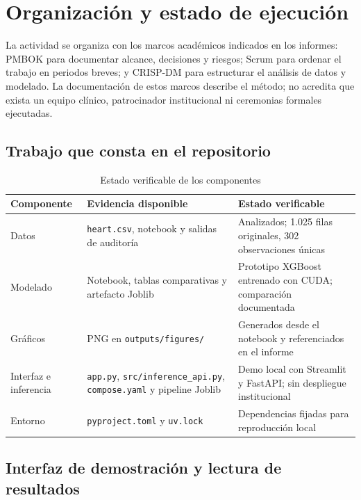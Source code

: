 \section{Organización y estado de ejecución}
\label{sec:gobernanza-ejecucion}

La actividad se organiza con los marcos académicos indicados en los informes: PMBOK para documentar alcance, decisiones y riesgos; Scrum para ordenar el trabajo en periodos breves; y CRISP-DM para estructurar el análisis de datos y modelado. La documentación de estos marcos describe el método; no acredita que exista un equipo clínico, patrocinador institucional ni ceremonias formales ejecutadas.

\subsection{Trabajo que consta en el repositorio}

\begin{table}[H]
  \centering
  \caption{Estado verificable de los componentes}
  \label{tab:estado-componentes}
  \small
  \begin{tabularx}{\textwidth}{@{}p{3cm}X X@{}}
    \toprule
    Componente & Evidencia disponible & Estado verificable \\
    \midrule
    Datos & \texttt{heart.csv}, notebook y salidas de auditoría & Analizados; 1.025 filas originales, 302 observaciones únicas \\
    Modelado & Notebook, tablas comparativas y artefacto Joblib & Prototipo XGBoost entrenado con CUDA; comparación documentada \\
    Gráficos & PNG en \texttt{outputs/figures/} & Generados desde el notebook y referenciados en el informe \\
    Interfaz e inferencia & \texttt{app.py}, \texttt{src/inference\_api.py}, \texttt{compose.yaml} y pipeline Joblib & Demo local con Streamlit y FastAPI; sin despliegue institucional \\
    Entorno & \texttt{pyproject.toml} y \texttt{uv.lock} & Dependencias fijadas para reproducción local \\
    \bottomrule
  \end{tabularx}
\end{table}

\subsection{Interfaz de demostración y lectura de resultados}
\label{subsec:evidencia-interfaz-prototipo}

